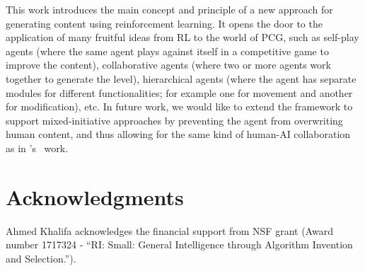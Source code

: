 \documentclass[letterpaper]{article} %
\begin{document}
This work introduces the main concept and principle of a new approach for generating content using reinforcement learning. It opens the door to the application of many fruitful ideas from RL to the world of PCG, such as self-play agents (where the same agent plays against itself in a competitive game to improve the content), collaborative agents (where two or more agents work together to generate the level), hierarchical agents (where the agent has separate modules for different functionalities; for example one for movement and another for modification), etc. In future work, we would like to extend the framework to support mixed-initiative approaches by preventing the agent from overwriting human content, and thus allowing for the same kind of human-AI collaboration as in \citeauthor{guzdial2018co}'s~ work.

\section*{Acknowledgments}
Ahmed Khalifa acknowledges the financial support from NSF grant (Award number 1717324 - ``RI: Small: General Intelligence through Algorithm Invention and Selection.'').



\end{document}
